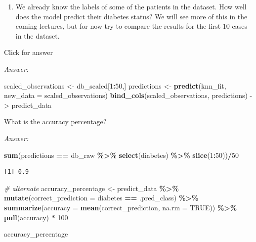\documentclass[
]{book}
\newenvironment{Shaded}{\begin{snugshade}}{\end{snugshade}}
\newcommand{\AttributeTok}[1]{\textcolor[rgb]{0.13,0.29,0.53}{#1}}
\newcommand{\CommentTok}[1]{\textcolor[rgb]{0.56,0.35,0.01}{\textit{#1}}}
\newcommand{\ConstantTok}[1]{\textcolor[rgb]{0.56,0.35,0.01}{#1}}
\newcommand{\DecValTok}[1]{\textcolor[rgb]{0.00,0.00,0.81}{#1}}
\newcommand{\FunctionTok}[1]{\textcolor[rgb]{0.13,0.29,0.53}{\textbf{#1}}}
\newcommand{\NormalTok}[1]{#1}
\newcommand{\OtherTok}[1]{\textcolor[rgb]{0.56,0.35,0.01}{#1}}
\newcommand{\SpecialCharTok}[1]{\textcolor[rgb]{0.81,0.36,0.00}{\textbf{#1}}}
\providecommand{\tightlist}{%
  \setlength{\itemsep}{0pt}\setlength{\parskip}{0pt}}
\begin{document}
\begin{enumerate}
\def\labelenumi{\alph{enumi}.}
\setcounter{enumi}{3}
\tightlist
\item
  We already know the labels of some of the patients in the dataset. How well does the model predict their diabetes status? We will see more of this in the coming lectures, but for now try to compare the results for the first 10 cases in the dataset.
\end{enumerate}

Click for answer

\emph{Answer:}

\begin{Shaded}
\begin{Highlighting}[]
\NormalTok{scaled\_observations }\OtherTok{\textless{}{-}}\NormalTok{ db\_scaled[}\DecValTok{1}\SpecialCharTok{:}\DecValTok{50}\NormalTok{,]}
\NormalTok{predictions }\OtherTok{\textless{}{-}} \FunctionTok{predict}\NormalTok{(knn\_fit, }\AttributeTok{new\_data =}\NormalTok{ scaled\_observations)}
\FunctionTok{bind\_cols}\NormalTok{(scaled\_observations, predictions) }\OtherTok{{-}\textgreater{}}\NormalTok{ predict\_data}
\end{Highlighting}
\end{Shaded}

What is the accuracy percentage?

\emph{Answer:}

\begin{Shaded}
\begin{Highlighting}[]
\FunctionTok{sum}\NormalTok{(predictions }\SpecialCharTok{==}\NormalTok{ db\_raw }\SpecialCharTok{\%\textgreater{}\%} \FunctionTok{select}\NormalTok{(diabetes) }\SpecialCharTok{\%\textgreater{}\%} \FunctionTok{slice}\NormalTok{(}\DecValTok{1}\SpecialCharTok{:}\DecValTok{50}\NormalTok{))}\SpecialCharTok{/}\DecValTok{50}
\end{Highlighting}
\end{Shaded}

\begin{verbatim}
[1] 0.9
\end{verbatim}

\begin{Shaded}
\begin{Highlighting}[]
\CommentTok{\# alternate}
\NormalTok{accuracy\_percentage }\OtherTok{\textless{}{-}}\NormalTok{ predict\_data }\SpecialCharTok{\%\textgreater{}\%}
  \FunctionTok{mutate}\NormalTok{(}\AttributeTok{correct\_prediction =}\NormalTok{ diabetes }\SpecialCharTok{==}\NormalTok{ .pred\_class) }\SpecialCharTok{\%\textgreater{}\%}
  \FunctionTok{summarize}\NormalTok{(}\AttributeTok{accuracy =} \FunctionTok{mean}\NormalTok{(correct\_prediction, }\AttributeTok{na.rm =} \ConstantTok{TRUE}\NormalTok{)) }\SpecialCharTok{\%\textgreater{}\%}
  \FunctionTok{pull}\NormalTok{(accuracy) }\SpecialCharTok{*} \DecValTok{100}

\NormalTok{accuracy\_percentage}
\end{Highlighting}
\end{Shaded}
\end{document}
